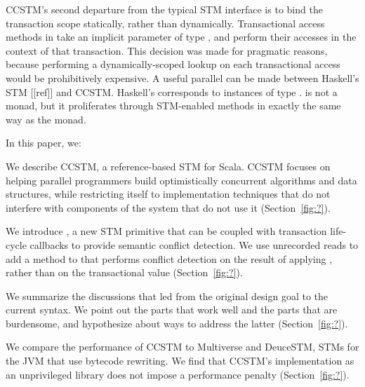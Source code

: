 CCSTM's second departure from the typical STM interface is to bind the
transaction scope statically, rather than dynamically.  Transactional access
methods in  take an implicit parameter of type , and
perform their accesses in the context of that transaction.  This decision
was made for pragmatic reasons, because performing a dynamically-scoped
lookup on each transactional access would be prohibitively expensive.
A useful parallel can be made between Haskell's STM [[ref]] and CCSTM.
Haskell's  corresponds to instances of type .
 is not a monad, but it proliferates through STM-enabled
methods in exactly the same way as the  monad.

In this paper, we:
\begin{packed_enum}

\item We describe CCSTM, a reference-based STM for Scala.  CCSTM focuses on
helping parallel programmers build optimistically concurrent algorithms
and data structures, while restricting itself to implementation techniques
that do not interfere with components of the system that do not use it
(Section~\ref{fig:?}).

\item We introduce , a new STM primitive that can be coupled with
transaction life-cycle callbacks to provide semantic conflict detection.  We use
unrecorded reads to add a  method to  that performs
conflict detection on the result of applying , rather than on the
transactional value (Section~\ref{fig:?}).

\item We summarize the discussions that led from the original design goal to
the current syntax.  We point out the parts that work well and the parts that
are burdensome, and hypothesize about ways to address the latter
(Section~\ref{fig:?}).

\item We compare the performance of CCSTM to Multiverse and DeuceSTM, STMs for
the JVM that use bytecode rewriting.  We find that CCSTM's implementation as an
unprivileged library does not impose a performance penalty
(Section~\ref{fig:?}).  

\end{packed_enum}

